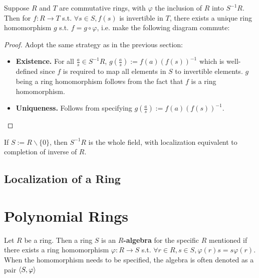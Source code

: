 \documentclass{article}
\begin{document}
\begin{theorem}
    Suppose $R$ and $T$ are commutative rings, with $\varphi$ the inclusion of $R$ into $S^{-1}R$. Then for $f: R\to T$ s.t. $\forall s\in S, f(s)$ is invertible in $T$, there exists a unique ring homomorphism $g$ s.t. $f = g\circ \varphi$, i.e. make the following diagram commute:
    \begin{figure}[htbp]
        \centering    
    \end{figure}
\end{theorem}

\begin{proof}
    Adopt the same strategy as in the previous section: 
    \begin{itemize}
        \item \textbf{Existence.} For all $\frac{a}{s}\in S^{-1}R$, $g(\frac{a}{s}) := f(a) (f(s))^{-1}$ which is well-defined since $f$ is required to map all elements in $S$ to invertible elements. $g$ being a ring homomorphism follows from the fact that $f$ is a ring homomorphism. 
        \item \textbf{Uniqueness.} Follows from specifying $g(\frac{a}{s}) := f(a) (f(s))^{-1}$.
    \end{itemize}
\end{proof}

\begin{remark}
    If $S := R\smallsetminus\{0\}$, then $S^{-1}R$ is the whole field, with localization equivalent to completion of inverse of $R$.
\end{remark}

\subsection{Localization of a Ring}

\newpage
\section{Polynomial Rings}

\begin{definition}[R-algebra]
    Let $R$ be a ring. Then a ring $S$ is an \textbf{$R$-algebra} for the specific $R$ mentioned if there exists a ring homomorphism $\varphi: R\to S$ s.t. $\forall r\in R, s\in S, \varphi(r)s = s\varphi(r)$. When the homomorphism needs to be specified, the algebra is often denoted as a pair $\langle S, \varphi \rangle$
\end{definition}
\end{document}
